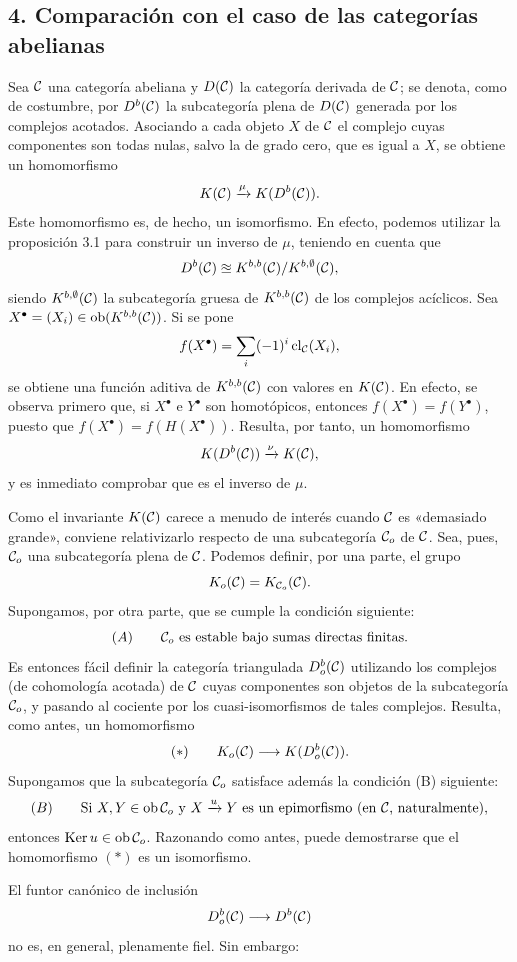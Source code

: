 \subsection*{4. Comparación con el caso de las categorías abelianas}

Sea $\mathcal C$ una categoría abeliana y $D(\mathcal C)$ la categoría derivada de $\mathcal C$; se denota, como de costumbre, por $D^b(\mathcal C)$ la subcategoría plena de $D(\mathcal C)$ generada por los complejos acotados. Asociando a cada objeto $X$ de $\mathcal C$ el complejo cuyas componentes son todas nulas, salvo la de grado cero, que es igual a $X$, se obtiene un homomorfismo
\[
K(\mathcal C)\xrightarrow{\mu}K(D^b(\mathcal C)).
\]
Este homomorfismo es, de hecho, un isomorfismo. En efecto, podemos utilizar la proposición 3.1 para construir un inverso de $\mu$, teniendo en cuenta que
\[
D^b(\mathcal C)\approxeq K^{b,b}(\mathcal C)/K^{b,\emptyset}(\mathcal C),
\]
siendo $K^{b,\emptyset}(\mathcal C)$ la subcategoría gruesa de $K^{b,b}(\mathcal C)$ de los complejos acíclicos. Sea $X^\bullet=(X_i)\in\operatorname{ob}(K^{b,b}(\mathcal C))$. Si se pone
\[
f(X^\bullet)=\sum_i(-1)^i\operatorname{cl}_{\mathcal C}(X_i),
\]
se obtiene una función aditiva de $K^{b,b}(\mathcal C)$ con valores en $K(\mathcal C)$. En efecto, se observa primero que, si $X^\bullet$ e $Y^\bullet$ son homotópicos, entonces $f(X^\bullet)=f(Y^\bullet)$, puesto que $f(X^\bullet)=f(H(X^\bullet))$. Resulta, por tanto, un homomorfismo
\[
K(D^b(\mathcal C))\xrightarrow{\nu}K(\mathcal C),
\]
y es inmediato comprobar que es el inverso de $\mu$.

Como el invariante $K(\mathcal C)$ carece a menudo de interés cuando $\mathcal C$ es «demasiado grande», conviene relativizarlo respecto de una subcategoría $\mathcal C_o$ de $\mathcal C$. Sea, pues, $\mathcal C_o$ una subcategoría plena de $\mathcal C$. Podemos definir, por una parte, el grupo
\[
K_o(\mathcal C)=K_{\mathcal C_o}(\mathcal C).
\]
Supongamos, por otra parte, que se cumple la condición siguiente:
\[
(A)\qquad \mathcal C_o\text{ es estable bajo sumas directas finitas.}
\]
Es entonces fácil definir la categoría triangulada $D_o^b(\mathcal C)$ utilizando los complejos (de cohomología acotada) de $\mathcal C$ cuyas componentes son objetos de la subcategoría $\mathcal C_o$, y pasando al cociente por los cuasi-isomorfismos de tales complejos. Resulta, como antes, un homomorfismo
\[
(*)\qquad K_o(\mathcal C)\longrightarrow K(D_o^b(\mathcal C)).
\]
Supongamos que la subcategoría $\mathcal C_o$ satisface además la condición (B) siguiente:
\[
(B)\qquad
\text{Si }X,Y\in\operatorname{ob}\mathcal C_o\text{ y }X\xrightarrow{u}Y
\text{ es un epimorfismo (en }\mathcal C\text{, naturalmente)},
\]
entonces $\operatorname{Ker}u\in\operatorname{ob}\mathcal C_o$. Razonando como antes, puede demostrarse que el homomorfismo $(*)$ es un isomorfismo.

El funtor canónico de inclusión
\[
D_o^b(\mathcal C)\longrightarrow D^b(\mathcal C)
\]
no es, en general, plenamente fiel. Sin embargo:
